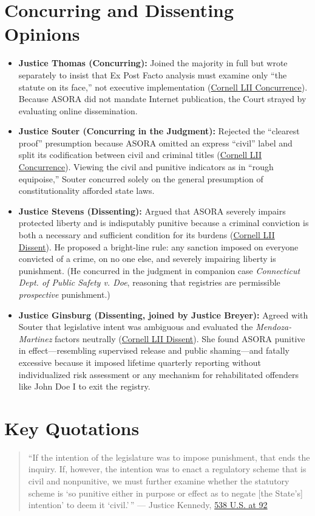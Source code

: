 \documentclass[12pt]{article}
\begin{document}
\section{Concurring and Dissenting Opinions}
\begin{itemize}
  \item \textbf{Justice Thomas (Concurring):} Joined the majority in full but wrote separately to insist that Ex Post Facto analysis must examine only ``the statute on its face,'' not executive implementation (\href{https://www.law.cornell.edu/supct/html/01-729.ZC.html}{Cornell LII Concurrence}). Because ASORA did not mandate Internet publication, the Court strayed by evaluating online dissemination.
  \item \textbf{Justice Souter (Concurring in the Judgment):} Rejected the ``clearest proof'' presumption because ASORA omitted an express ``civil'' label and split its codification between civil and criminal titles (\href{https://www.law.cornell.edu/supct/html/01-729.ZC1.html}{Cornell LII Concurrence}). Viewing the civil and punitive indicators as in ``rough equipoise,'' Souter concurred solely on the general presumption of constitutionality afforded state laws.
  \item \textbf{Justice Stevens (Dissenting):} Argued that ASORA severely impairs protected liberty and is indisputably punitive because a criminal conviction is both a necessary and sufficient condition for its burdens (\href{https://www.law.cornell.edu/supct/html/01-729.ZD.html}{Cornell LII Dissent}). He proposed a bright-line rule: any sanction imposed on everyone convicted of a crime, on no one else, and severely impairing liberty is punishment. (He concurred in the judgment in companion case \textit{Connecticut Dept. of Public Safety v. Doe}, reasoning that registries are permissible \textit{prospective} punishment.)
  \item \textbf{Justice Ginsburg (Dissenting, joined by Justice Breyer):} Agreed with Souter that legislative intent was ambiguous and evaluated the \textit{Mendoza-Martinez} factors neutrally (\href{https://www.law.cornell.edu/supct/html/01-729.ZD1.html}{Cornell LII Dissent}). She found ASORA punitive in effect---resembling supervised release and public shaming---and fatally excessive because it imposed lifetime quarterly reporting without individualized risk assessment or any mechanism for rehabilitated offenders like John Doe I to exit the registry.
\end{itemize}

\section{Key Quotations}
\begin{quote}
``If the intention of the legislature was to impose punishment, that ends the inquiry. If, however, the intention was to enact a regulatory scheme that is civil and nonpunitive, we must further examine whether the statutory scheme is `so punitive either in purpose or effect as to negate [the State's] intention' to deem it `civil.'\,'' --- Justice Kennedy, \href{https://www.law.cornell.edu/supct/html/01-729.ZO.html}{538 U.S. at 92}
\end{quote}
\end{document}
